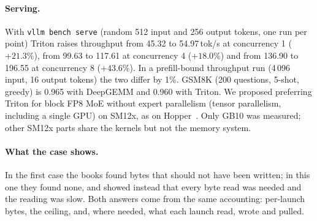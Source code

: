\paragraph{Serving.}
With \texttt{vllm bench serve} (random 512 input and 256 output tokens, one run per point) Triton
raises throughput from 45.32 to 54.97\,tok/s at concurrency 1 ($+21.3\%$), from 99.63 to
117.61 at concurrency 4 ($+18.0\%$) and from 136.90 to 196.55 at concurrency 8 ($+43.6\%$). In a
prefill-bound throughput run (4\,096 input, 16 output tokens) the two differ by 1\%. GSM8K
(200 questions, 5-shot, greedy) is 0.965 with DeepGEMM and 0.960 with Triton. We proposed
preferring Triton for block FP8 MoE without expert parallelism (tensor parallelism,
including a single GPU) on SM12x, as on Hopper~\cite{vllmpr69355}. Only GB10 was measured; other SM12x parts share the kernels but not the
memory system.

\paragraph{What the case shows.}
In the first case the books found bytes that should not have been written; in this one they found
none, and showed instead that every byte read was needed and the reading was slow. Both answers
come from the same accounting: per-launch bytes, the ceiling, and, where needed, what each launch
read, wrote and pulled.
